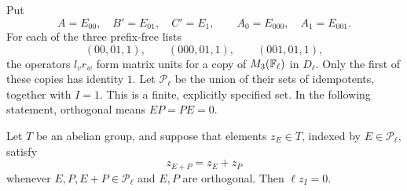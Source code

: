 Put
\[
 A=E_{00},\quad B'=E_{01},\quad C'=E_1,
 \qquad A_0=E_{000},\quad A_1=E_{001}.
\]
For each of the three prefix-free lists
\[
 (00,01,1),\qquad (000,01,1),\qquad (001,01,1),
\]
the operators $l_vr_w$ form matrix units for a copy of
$M_3(\mathbb F_\ell)$ in $D_\ell$.  Only the first of these copies has
identity $1$.  Let $\mathcal P_\ell$ be the union of their sets of
idempotents, together with $I=1$.  This is a finite, explicitly
specified set.  In the following statement, orthogonal means
$EP=PE=0$.

\begin{lemma}\label{lem:idempotents}
Let $T$ be an abelian group, and suppose that elements $z_E\in T$,
indexed by $E\in\mathcal P_\ell$, satisfy
\begin{equation}\label{eq:idempotent-additivity}
 z_{E+P}=z_E+z_P
\end{equation}
whenever $E,P,E+P\in\mathcal P_\ell$ and $E,P$ are orthogonal.
Then $\ell z_I=0$.
\end{lemma}

